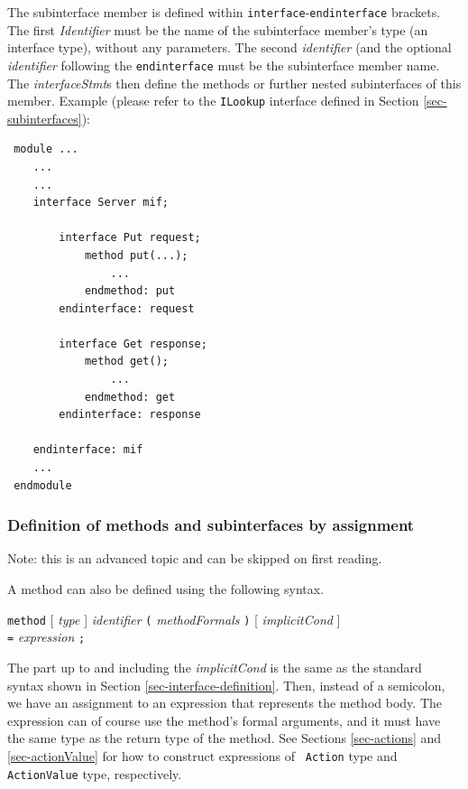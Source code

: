 \documentclass[twoside,letterpaper]{article}
\newcommand{\hm}{\hspace*{1em}}
\newcommand{\te}[1]{\texttt{#1}}
\newcommand{\nterm}[1]{\emph{#1}}
\newcommand{\term}[1]{\texttt{#1}}
\newcommand{\opt}[1]{[ #1 ]}
\newcommand{\gram}[2]{    \hm\makebox[10em][l]{\it #1}\makebox[1.5em][l]{::=}    #2}
\newcommand{\grammore}[1]{\hm\makebox[10em][l]{      }\makebox[1.5em][l]{}       #1}
\begin{document}
The subinterface member is defined within
{\te{interface}}-{\te{endinterface}} brackets.  The first
{\nterm{Identifier}} must be the name of the subinterface member's
type (an interface type), without any parameters.  The second
\nterm{identifier} (and the optional \nterm{identifier} following the
{\te{endinterface}} must be the subinterface member name.  The
{\nterm{interfaceStmt}}s then define the methods or further
nested subinterfaces of this member.  Example (please refer to the
\texttt{ILookup} interface defined in Section \ref{sec-subinterfaces}):

\begin{verbatim}
 module ...
    ...
    ...
    interface Server mif;

        interface Put request;
            method put(...);
                ...
            endmethod: put
        endinterface: request

        interface Get response;
            method get();
                ...
            endmethod: get
        endinterface: response

    endinterface: mif
    ...
 endmodule
\end{verbatim}


\subsubsection{Definition of methods and subinterfaces by assignment}

\label{sec-interface-definition-by-assignment}

Note: this is an advanced topic and can be skipped on first reading.

A method can also be defined using the following syntax.

\gram{methodDef}{ \term{method} \opt{ \nterm{type} } \nterm{identifier}
                      \term{(} \nterm{methodFormals} \term{)}
                      \opt{ \nterm{implicitCond} } } \\
\grammore       { \hm \term{=} \nterm{expression} \term{;} }

The part up to and including the \nterm{implicitCond} is the same as
the standard syntax shown in Section {\ref{sec-interface-definition}}.
Then, instead of a semicolon, we have an assignment to an expression
that represents the method body.  The expression can of course use the
method's formal arguments, and it must have the same type as the
return type of the method.  See Sections {\ref{sec-actions}} and
{\ref{sec-actionValue}} for how to construct expressions of {\tt
Action} type and \texttt{ActionValue} type, respectively.
\end{document}
